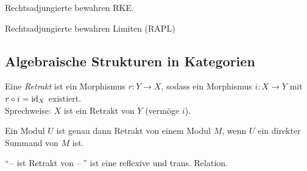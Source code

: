 \documentclass{cheat-sheet}
\DeclareMathOperator{\Quot}{Quot} %
\newenvironment{centertikzcd}
  {\begin{center}\begin{tikzcd}}
  {\end{tikzcd}\end{center}}
\begin{document}
\begin{thm}
  Rechtsadjungierte bewahren RKE.
\end{thm}

\begin{kor}
  Rechtsadjungierte bewahren Limiten (RAPL)
\end{kor}

\iffalse
\begin{bsp}
  Sei $G : \Field \to \Ring$ der Vergissfunktor. Dann ist
  \[ (\Ran_G(G))(R) = \prod_{\mathfrak{p} \subset R} \Quot(R/{\mathfrak{p}}). \]
\end{bsp}
\fi

\subsection{Algebraische Strukturen in Kategorien}

\begin{defn}
  Eine \emph{Retrakt} ist ein Morphismus $r : Y \to X$, sodass ein Morphismus $i : X \to Y$ mit $r \circ i = \operatorname{id}_X$ existiert. \\
  Sprechweise: $X$ ist ein Retrakt von $Y$ (vermöge $i$).
\end{defn}


\begin{bsp}
  Ein Modul $U$ ist genau dann Retrakt von einem Modul $M$, wenn $U$ ein direkter Summand von $M$ ist.
\end{bsp}

\begin{prop}
  "`$\text{--}$ ist Retrakt von $\text{--}$\,"' ist eine reflexive und trans. Relation.
\end{prop}

\end{document}
